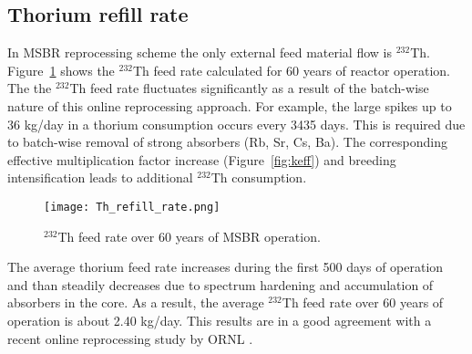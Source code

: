 \subsection{Thorium refill rate}
In \gls{MSBR} reprocessing scheme the only external feed material flow  is $^{232}$Th. Figure~\ref{fig:th_refill} shows the $^{232}$Th feed rate calculated for 60 years of reactor operation. The the $^{232}$Th feed rate fluctuates significantly as a result of the batch-wise nature of this online reprocessing approach. For example, the large spikes up to 36 kg/day in a thorium consumption occurs every 3435 days. This is required due to batch-wise removal of strong absorbers (Rb, Sr, Cs, Ba). The corresponding effective multiplication factor increase (Figure~\ref{fig:keff}) and breeding intensification leads to additional $^{232}$Th consumption. 
\begin{figure}[ht!] %
  \centering
  \texttt{[image: Th\_refill\_rate.png]} 
  \caption{$^{232}$Th feed rate over 60 years of \gls{MSBR} operation.}
  \label{fig:th_refill}
\end{figure}

The average thorium feed rate increases during the first 500 days of operation and than steadily decreases due to spectrum hardening and accumulation of absorbers in the core. As a result, the average $^{232}$Th feed rate over 60 years of operation is about 2.40 kg/day. This results are in a good agreement with a recent online reprocessing study by \gls{ORNL} \cite{betzler_molten_2017}.


